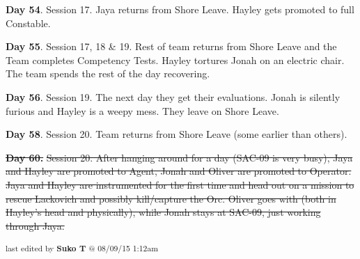\textbf{Day 54}. Session 17.  Jaya returns from Shore Leave.  Hayley gets promoted to full Constable.

\textbf{Day 55}. Session 17, 18 \& 19. Rest of team returns from Shore Leave and the Team completes Competency Tests.  Hayley tortures Jonah on an electric chair.  The team spends the rest of the day recovering. 

\textbf{Day 56}. Session 19. The next day they get their evaluations.  Jonah is silently furious and Hayley is a weepy mess.  They leave on Shore Leave.

\textbf{Day 58}.  Session 20.  Team returns from Shore Leave (some earlier than others).  

\sout{ \textbf{Day 60.} }\sout{   Session 20.  After hanging around for a day (SAC-09 is very busy), Jaya and Hayley are promoted to Agent, Jonah and Oliver are promoted to Operator.  Jaya and Hayley are instrumented for the first time and head out on a mission to rescue Lackovich and possibly kill/capture the Orc.  Oliver goes with (both in Hayley's head and physically), while Jonah stays at SAC-09, just working through Jaya. }

\vspace{\fill}

\begin{flushright}
\textsubscript{last edited by \textbf{Suko T} @ 08/09/15 1:12am}
\end{flushright}

